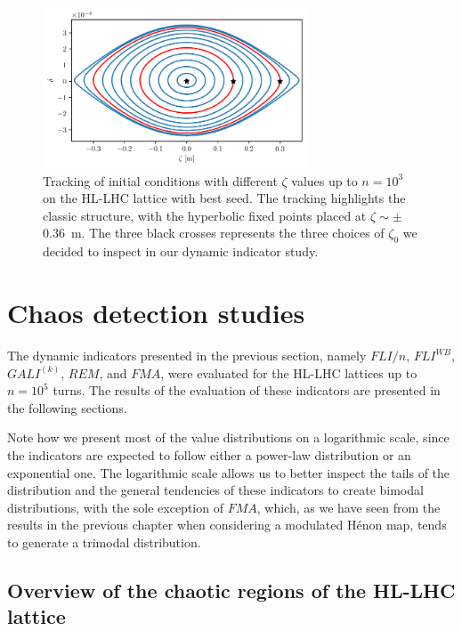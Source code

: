 \begin{figure}[th]
    \centering
    \includegraphics[width=0.7\textwidth]{6_lhc_dynamic_indicators/figs/longitudinal.pdf}
    \caption{Tracking of initial conditions with different $\zeta$ values up to $n=10^3$ on the HL-LHC lattice with best seed. The tracking highlights the classic structure, with the hyperbolic fixed points placed at $\zeta \sim \pm$ \SI{0.36}{\meter}. The three black crosses represents the three choices of $\zeta_0$ we decided to inspect in our dynamic indicator study.}
    \label{fig:the_bunch}
\end{figure}

\section{Chaos detection studies} \label{sec:8:results}

The dynamic indicators presented in the previous section, namely $FLI/n$, $FLI^{WB}$, $GALI^{(k)}$, $REM$, and $FMA$, were evaluated for the HL-LHC lattices up to $n=10^5$ turns. The results of the evaluation of these indicators are presented in the following sections.

Note how we present most of the value distributions on a logarithmic scale, since the indicators are expected to follow either a power-law distribution or an exponential one. The logarithmic scale allows us to better inspect the tails of the distribution and the general tendencies of these indicators to create bimodal distributions, with the sole exception of $FMA$, which, as we have seen from the results in the previous chapter when considering a modulated Hénon map, tends to generate a trimodal distribution.

\subsection{Overview of the chaotic regions of the HL-LHC lattice}

